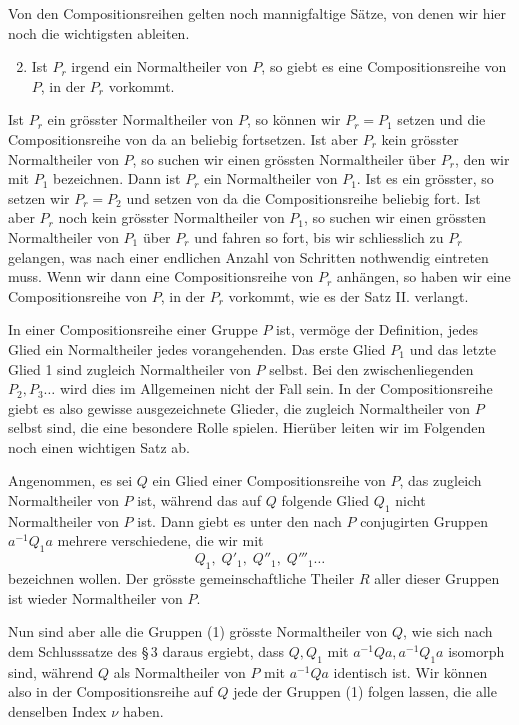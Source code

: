 \documentclass[11pt]{article}
\begin{document}
Von den Compositionsreihen gelten noch mannigfaltige Sätze, von denen wir hier noch die wichtigsten ableiten.

\begin{enumerate}[label=\Roman*.]
\setcounter{enumi}{1}
\item Ist $P_r$ irgend ein Normaltheiler von $P$, so giebt es eine Compositionsreihe von $P$, in der $P_r$ vorkommt.
\end{enumerate}

Ist $P_r$ ein grösster Normaltheiler von $P$, so können wir $P_r=P_1$ setzen und die Compositionsreihe von da an beliebig fortsetzen. Ist aber $P_r$ kein grösster Normaltheiler von $P$, so suchen wir einen grössten Normaltheiler über $P_r$, den wir mit $P_1$ bezeichnen. Dann ist $P_r$ ein Normaltheiler von $P_1$. Ist es ein grösster, so setzen wir $P_r=P_2$ und setzen von da die Compositionsreihe beliebig fort. Ist aber $P_r$ noch kein grösster Normaltheiler von $P_1$, so suchen wir einen grössten Normaltheiler von $P_1$ über $P_r$ und fahren so fort, bis wir schliesslich zu $P_r$ gelangen, was nach einer endlichen Anzahl von Schritten nothwendig eintreten muss. Wenn wir dann eine Compositionsreihe von $P_r$ anhängen, so haben wir eine Compositionsreihe von $P$, in der $P_r$ vorkommt, wie es der Satz II. verlangt.

In einer Compositionsreihe einer Gruppe $P$ ist, vermöge der Definition, jedes Glied ein Normaltheiler jedes vorangehenden. Das erste Glied $P_1$ und das letzte Glied 1 sind zugleich Normaltheiler von $P$ selbst. Bei den zwischenliegenden $P_2,P_3\ldots$ wird dies im Allgemeinen nicht der Fall sein. In der Compositionsreihe giebt es also gewisse ausgezeichnete Glieder, die zugleich Normaltheiler von $P$ selbst sind, die eine besondere Rolle spielen. Hierüber leiten wir im Folgenden noch einen wichtigen Satz ab.

Angenommen, es sei $Q$ ein Glied einer Compositionsreihe von $P$, das zugleich Normaltheiler von $P$ ist, während das auf $Q$ folgende Glied $Q_1$ nicht Normaltheiler von $P$ ist. Dann giebt es unter den nach $P$ conjugirten Gruppen $a^{-1}Q_1a$ mehrere verschiedene, die wir mit
\begin{equation}
Q_1,\;Q'_1,\;Q''_1,\;Q'''_1\ldots
\tag{1}
\end{equation}
bezeichnen wollen. Der grösste gemeinschaftliche Theiler $R$ aller dieser Gruppen ist wieder Normaltheiler von $P$.

Nun sind aber alle die Gruppen (1) grösste Normaltheiler von $Q$, wie sich nach dem Schlusssatze des \S\,3 daraus ergiebt, dass $Q,Q_1$ mit $a^{-1}Qa,a^{-1}Q_1a$ isomorph sind, während $Q$ als Normaltheiler von $P$ mit $a^{-1}Qa$ identisch ist. Wir können also in der Compositionsreihe auf $Q$ jede der Gruppen (1) folgen lassen, die alle denselben Index $\nu$ haben.
\end{document}
